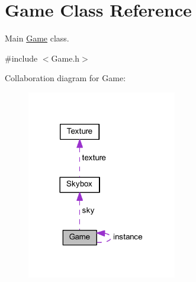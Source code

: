 \hypertarget{class_game}{}\section{Game Class Reference}
\label{class_game}


Main \mbox{\hyperlink{class_game}{Game}} class.  




{\ttfamily \#include $<$Game.\+h$>$}



Collaboration diagram for Game\+:
\nopagebreak
\begin{figure}[H]
\begin{center}
\leavevmode
\includegraphics[width=185pt]{class_game__coll__graph}
\end{center}
\end{figure}
